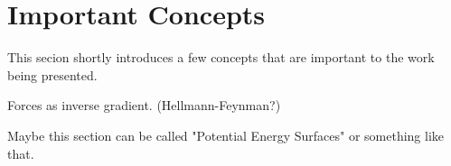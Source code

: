 \section{Important Concepts}
\label{sec:important-concepts}

This secion shortly introduces a few concepts that are important to the work being presented.

\bit
\item Forces as inverse gradient. (Hellmann-Feynman?)
\item Maybe this section can be called "Potential Energy Surfaces" or something like that.
\eit

\incomplete







